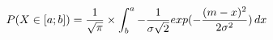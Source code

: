 \documentclass[preview]{standalone}
\begin{document}
\begin{align*}
P( X \in [a;b] ) = { \frac{1}{\sqrt{\pi}} } \times \int_b^a { { - \frac{1}{\sigma \sqrt{2}} } exp(-{ {(m - x)^2} \over {2 \sigma^2} }) } \, dx
\end{align*}
\end{document}
